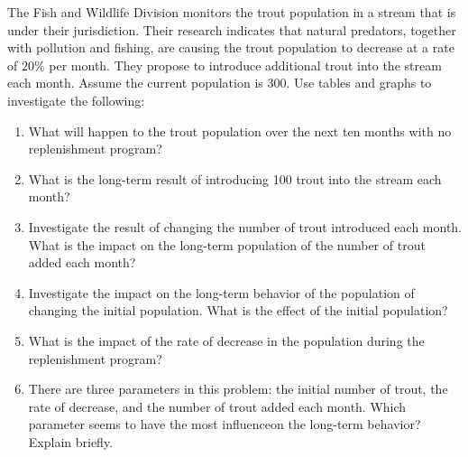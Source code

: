 \documentclass[10pt,]{book}
\theoremstyle{ptxdefinitionnotitle}
\theoremstyle{ptxdefinitiontitle}
\theoremstyle{ptxdefinitionnotitle}
\theoremstyle{ptxdefinitiontitle}
\theoremstyle{ptxdefinitionnotitle}
\theoremstyle{ptxdefinitiontitle}
\numberwithin{equation}{section}
\begin{document}
\begin{divisionexercise}{6}\hypertarget{exercise-8}{}
\hypertarget{p-26}{}%
The Fish and Wildlife Division monitors the trout population in a stream that is under their jurisdiction.  Their research indicates that natural predators, together with pollution and fishing, are causing the trout population to decrease at a rate of \(20\%\) per month.  They propose to introduce additional trout into the stream each month.  Assume the current population is 300.  Use tables and graphs to investigate the following: \leavevmode%
\begin{enumerate}[label=(\alph*)]
\item\hypertarget{li-25}{}What will happen to the trout population over the next ten months with no replenishment program?%
\item\hypertarget{li-26}{}What is the long-term result of introducing 100 trout into the stream each month?%
\item\hypertarget{li-27}{}Investigate the result of changing the number of trout introduced each month.  What is the impact on the long-term population of the number of trout added each month?%
\item\hypertarget{li-28}{}Investigate the impact on the long-term behavior of the population of changing the initial population.  What is the effect of the initial population?%
\item\hypertarget{li-29}{}What is the impact of the rate of decrease in the population during the replenishment program?%
\item\hypertarget{li-30}{}There are three parameters in this problem: the initial number of trout, the rate of decrease, and the number of trout added each month. Which parameter seems to have the most influenceon the long-term behavior? Explain briefly.%
\end{enumerate}
%
\end{divisionexercise}%
\end{document}
